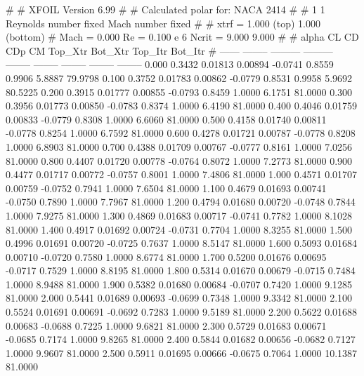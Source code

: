 #  
#       XFOIL         Version 6.99
#  
# Calculated polar for: NACA 2414                                       
#  
# 1 1 Reynolds number fixed          Mach number fixed         
#  
# xtrf =   1.000 (top)        1.000 (bottom)  
# Mach =   0.000     Re =     0.100 e 6     Ncrit =   9.000  9.000
#  
#   alpha    CL        CD       CDp       CM     Top_Xtr  Bot_Xtr  Top_Itr  Bot_Itr
#  ------ -------- --------- --------- -------- -------- -------- -------- --------
   0.000   0.3432   0.01813   0.00894  -0.0741   0.8559   0.9906   5.8887  79.9798
   0.100   0.3752   0.01783   0.00862  -0.0779   0.8531   0.9958   5.9692  80.5225
   0.200   0.3915   0.01777   0.00855  -0.0793   0.8459   1.0000   6.1751  81.0000
   0.300   0.3956   0.01773   0.00850  -0.0783   0.8374   1.0000   6.4190  81.0000
   0.400   0.4046   0.01759   0.00833  -0.0779   0.8308   1.0000   6.6060  81.0000
   0.500   0.4158   0.01740   0.00811  -0.0778   0.8254   1.0000   6.7592  81.0000
   0.600   0.4278   0.01721   0.00787  -0.0778   0.8208   1.0000   6.8903  81.0000
   0.700   0.4388   0.01709   0.00767  -0.0777   0.8161   1.0000   7.0256  81.0000
   0.800   0.4407   0.01720   0.00778  -0.0764   0.8072   1.0000   7.2773  81.0000
   0.900   0.4477   0.01717   0.00772  -0.0757   0.8001   1.0000   7.4806  81.0000
   1.000   0.4571   0.01707   0.00759  -0.0752   0.7941   1.0000   7.6504  81.0000
   1.100   0.4679   0.01693   0.00741  -0.0750   0.7890   1.0000   7.7967  81.0000
   1.200   0.4794   0.01680   0.00720  -0.0748   0.7844   1.0000   7.9275  81.0000
   1.300   0.4869   0.01683   0.00717  -0.0741   0.7782   1.0000   8.1028  81.0000
   1.400   0.4917   0.01692   0.00724  -0.0731   0.7704   1.0000   8.3255  81.0000
   1.500   0.4996   0.01691   0.00720  -0.0725   0.7637   1.0000   8.5147  81.0000
   1.600   0.5093   0.01684   0.00710  -0.0720   0.7580   1.0000   8.6774  81.0000
   1.700   0.5200   0.01676   0.00695  -0.0717   0.7529   1.0000   8.8195  81.0000
   1.800   0.5314   0.01670   0.00679  -0.0715   0.7484   1.0000   8.9488  81.0000
   1.900   0.5382   0.01680   0.00684  -0.0707   0.7420   1.0000   9.1285  81.0000
   2.000   0.5441   0.01689   0.00693  -0.0699   0.7348   1.0000   9.3342  81.0000
   2.100   0.5524   0.01691   0.00691  -0.0692   0.7283   1.0000   9.5189  81.0000
   2.200   0.5622   0.01688   0.00683  -0.0688   0.7225   1.0000   9.6821  81.0000
   2.300   0.5729   0.01683   0.00671  -0.0685   0.7174   1.0000   9.8265  81.0000
   2.400   0.5844   0.01682   0.00656  -0.0682   0.7127   1.0000   9.9607  81.0000
   2.500   0.5911   0.01695   0.00666  -0.0675   0.7064   1.0000  10.1387  81.0000

